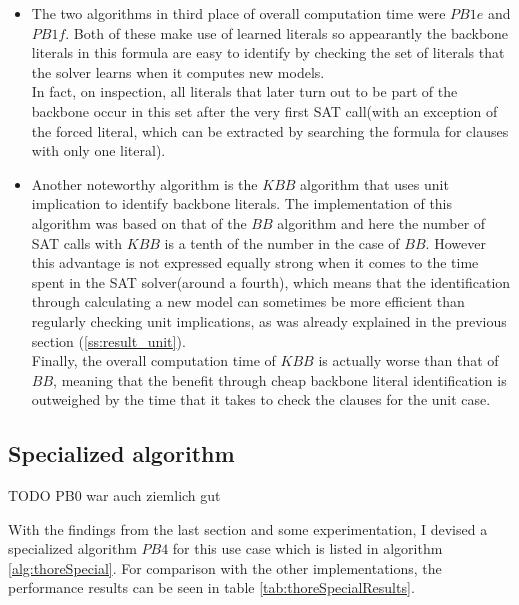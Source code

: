 \begin{itemize}
\item The two algorithms in third place of overall computation time were $PB1e$ and $PB1f$. Both of these make use of learned literals so appearantly the backbone literals in this formula are easy to identify by checking the set of literals that the solver learns when it computes new models.\\
In fact, on inspection, all literals that later turn out to be part of the backbone occur in this set after the very first SAT call(with an exception of the forced literal, which can be extracted by searching the formula for clauses with only one literal).
\item Another noteworthy algorithm is the $KBB$ algorithm that uses unit implication to identify backbone literals. The implementation of this algorithm was based on that of the $BB$ algorithm and here the number of SAT calls with $KBB$ is a tenth of the number in the case of $BB$. However this advantage is not expressed equally strong when it comes to the time spent in the SAT solver(around a fourth), which means that the identification through calculating a new model can sometimes be more efficient than regularly checking unit implications, as was already explained in the previous section (\ref{ss:result_unit}).\\
Finally, the overall computation time of $KBB$ is actually worse than that of $BB$, meaning that the benefit through cheap backbone literal identification is outweighed by the time that it takes to check the clauses for the unit case. 
\end{itemize}

\subsection{Specialized algorithm}
TODO PB0 war auch ziemlich gut

With the findings from the last section and some experimentation, I devised a specialized algorithm $PB4$ for this use case which is listed in algorithm \ref{alg:thoreSpecial}. For comparison with the other implementations, the performance results can be seen in table \ref{tab:thoreSpecialResults}.

